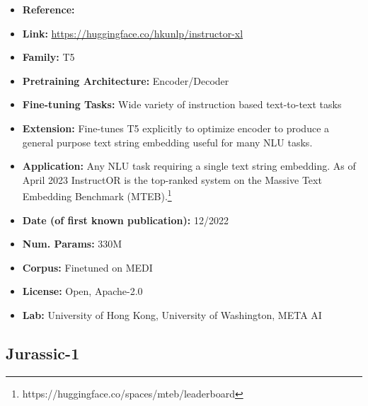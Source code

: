 \documentclass{article}
\begin{document}
            \begin{itemize}
                \item \textbf{Reference:} 
                \item \textbf{Link:} \url{https://huggingface.co/hkunlp/instructor-xl}
                \item \textbf{Family:} T5 
                \item \textbf{Pretraining Architecture:} Encoder/Decoder
                 \item \textbf{Fine-tuning Tasks:} Wide variety of instruction based text-to-text tasks 
                \item \textbf{Extension:} Fine-tunes T5 explicitly to optimize encoder to produce a general purpose text string embedding useful for many NLU tasks.
                \item \textbf{Application:} Any NLU task requiring a single text string embedding. As of April 2023 InstructOR is the top-ranked system on the Massive Text Embedding Benchmark (MTEB).\footnote{https://huggingface.co/spaces/mteb/leaderboard}
                \item \textbf{Date (of first known publication):} 12/2022
                \item \textbf{Num. Params:} 330M
                \item \textbf{Corpus:} Finetuned on MEDI 
                \item \textbf{License:} Open, Apache-2.0
                \item \textbf{Lab:} University of Hong Kong, University of Washington, META AI
            \end{itemize}

\subsection{Jurassic-1}
\end{document}
